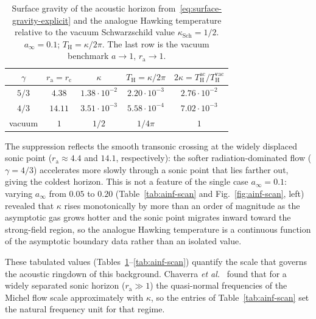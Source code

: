 \documentclass[12pt,a4paper,preprint]{elsarticle}
\begin{document}
            \begin{table}[htb]
                \centering
                \caption{Surface gravity of the acoustic horizon from~\eqref{eq:surface-gravity-explicit} and the analogue Hawking temperature relative to the vacuum Schwarzschild value $\kappa_{\mathrm{Sch}}=1/2$. $a_{\infty}=0.1$; $T_{\mathrm{H}}=\kappa/2\pi$. The last row is the vacuum benchmark $a\to 1$, $r_{\mathrm{a}}\to 1$.}
                \label{tab:surface-gravity}
                {\small
                \begin{tabular}{ccccc}
                    \toprule
                    $\gamma$ & $r_{\mathrm{a}}=r_{\mathrm{c}}$ & $\kappa$ & $T_{\mathrm{H}}=\kappa/2\pi$ & $2\kappa=T^{\mathrm{ac}}_{\mathrm{H}}/T^{\mathrm{vac}}_{\mathrm{H}}$ \\
                    \midrule
                    $5/3$    & $4.38$  & $1.38\cdot 10^{-2}$ & $2.20\cdot 10^{-3}$ & $2.76\cdot 10^{-2}$ \\
                    $4/3$    & $14.11$ & $3.51\cdot 10^{-3}$ & $5.58\cdot 10^{-4}$ & $7.02\cdot 10^{-3}$ \\
                    \midrule
                    vacuum     & $1$     & $1/2$               & $1/4\pi$            & $1$ \\
                    \bottomrule
                \end{tabular}
                }
            \end{table}

            The suppression reflects the smooth transonic crossing at the widely displaced sonic point ($r_{\mathrm{a}}\approx 4.4$ and $14.1$, respectively): the softer radiation-dominated flow ($\gamma=4/3$) accelerates more slowly through a sonic point that lies farther out, giving the coldest horizon. This is not a feature of the single case $a_{\infty}=0.1$: varying $a_{\infty}$ from $0.05$ to $0.20$ (Table~\ref{tab:ainf-scan} and Fig.~\ref{fig:ainf-scan}, left) revealed that $\kappa$ rises monotonically by more than an order of magnitude as the asymptotic gas grows hotter and the sonic point migrates inward toward the strong-field region, so the analogue Hawking temperature is a continuous function of the asymptotic boundary data rather than an isolated value.

            These tabulated values (Tables~\ref{tab:surface-gravity}--\ref{tab:ainf-scan}) quantify the scale that governs the acoustic ringdown of this background. Chaverra \emph{et al.}~\cite{ChaverraE_MoralesMD_SarbachO_QuasinormalAcousticOscillationsInTheMichelFlow_2015} found that for a widely separated sonic horizon ($r_{\mathrm{a}}\gg 1$) the quasi-normal frequencies of the Michel flow scale approximately with $\kappa$, so the entries of Table~\ref{tab:ainf-scan} set the natural frequency unit for that regime.
\end{document}
